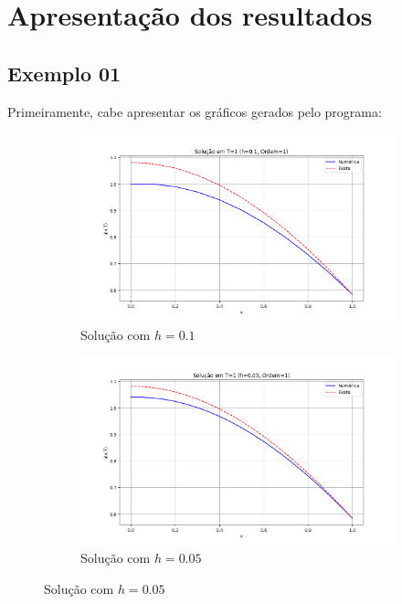 \documentclass[column,amsmath,amssymb,floatfix]{revtex4}
\begin{document}
\section{Apresentação dos resultados}

\subsection{Exemplo 01}

Primeiramente, cabe apresentar os gráficos gerados pelo programa:

\begin{figure}[H]
	\centering
	\begin{subfigure}{0.35\textwidth}
		\includegraphics[width=\textwidth]{img/ex0101.png}
		\caption{Solução com $h=0.1$}
		\label{fig:ex1_1}
	\end{subfigure}
	\begin{subfigure}{0.35\textwidth}
		\includegraphics[width=\textwidth]{img/ex0102.png}
		\caption{Solução com $h=0.05$}
		\label{fig:ex1_2}
	\end{subfigure}

\end{figure}
\end{document}
